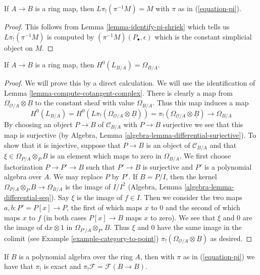 \begin{lemma}
\label{lemma-pi-lower-shriek-constant-sheaf}
If $A \to B$ is a ring map, then $L\pi_!(\pi^{-1}M) = M$
with $\pi$ as in (\ref{equation-pi}).
\end{lemma}

\begin{proof}
This follows from Lemma \ref{lemma-identify-pi-shriek} which tells us
$L\pi_!(\pi^{-1}M)$ is computed by $(\pi^{-1}M)(P_\bullet, \epsilon)$
which is the constant simplicial object on $M$.
\end{proof}

\begin{lemma}
\label{lemma-identify-H0}
If $A \to B$ is a ring map, then $H^0(L_{B/A}) = \Omega_{B/A}$.
\end{lemma}

\begin{proof}
We will prove this by a direct calculation.
We will use the identification of Lemma \ref{lemma-compute-cotangent-complex}.
There is clearly a map from $\Omega_{\mathcal{O}/A} \otimes \underline{B}$
to the constant sheaf with value $\Omega_{B/A}$. Thus this map induces
a map
$$
H^0(L_{B/A}) = H^0(L\pi_!(\Omega_{\mathcal{O}/A} \otimes \underline{B}))
= \pi_!(\Omega_{\mathcal{O}/A} \otimes \underline{B}) \to \Omega_{B/A}
$$
By choosing an object $P \to B$ of $\mathcal{C}_{B/A}$ with $P \to B$
surjective we see that this map is surjective (by
Algebra, Lemma \ref{algebra-lemma-differential-surjective}).
To show that it is injective, suppose that $P \to B$ is an object
of $\mathcal{C}_{B/A}$ and that $\xi \in \Omega_{P/A} \otimes_P B$
is an element which maps to zero in $\Omega_{B/A}$.
We first choose factorization $P \to P' \to B$ such that $P' \to B$
is surjective and $P'$ is a polynomial algebra over $A$.
We may replace $P$ by $P'$. If $B = P/I$, then the kernel
$\Omega_{P/A} \otimes_P B \to \Omega_{B/A}$ is the image of
$I/I^2$ (Algebra, Lemma \ref{algebra-lemma-differential-seq}).
Say $\xi$ is the image of $f \in I$.
Then we consider the two maps $a, b : P' = P[x] \to P$, the first of which
maps $x$ to $0$ and the second of which maps $x$ to $f$ (in both
cases $P[x] \to B$ maps $x$ to zero). We see that $\xi$ and $0$
are the image of $\text{d}x \otimes 1$ in $\Omega_{P'/A} \otimes_{P'} B$.
Thus $\xi$ and $0$ have the same image in the colimit (see
Example \ref{example-category-to-point})
$\pi_!(\Omega_{\mathcal{O}/A} \otimes \underline{B})$ as desired.
\end{proof}

\begin{lemma}
\label{lemma-pi-lower-shriek-polynomial-algebra}
If $B$ is a polynomial algebra over the ring $A$, then
with $\pi$ as in (\ref{equation-pi}) we have that
$\pi_!$ is exact and $\pi_!\mathcal{F} = \mathcal{F}(B \to B)$.
\end{lemma}


